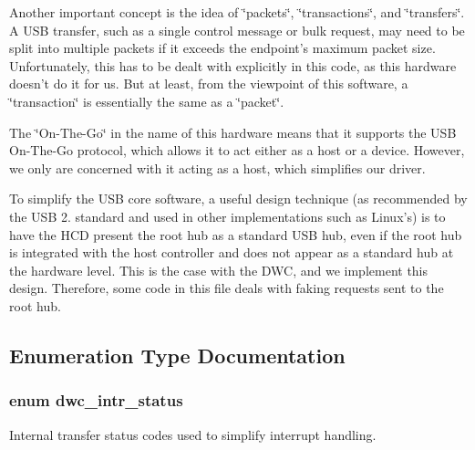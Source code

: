 Another important concept is the idea of \char`\"{}packets\char`\"{}, \char`\"{}transactions\char`\"{}, and \char`\"{}transfers\char`\"{}. A U\-S\-B transfer, such as a single control message or bulk request, may need to be split into multiple packets if it exceeds the endpoint's maximum packet size. Unfortunately, this has to be dealt with explicitly in this code, as this hardware doesn't do it for us. But at least, from the viewpoint of this software, a \char`\"{}transaction\char`\"{} is essentially the same as a \char`\"{}packet\char`\"{}.

The \char`\"{}\-On-\/\-The-\/\-Go\char`\"{} in the name of this hardware means that it supports the U\-S\-B On-\/\-The-\/\-Go protocol, which allows it to act either as a host or a device. However, we only are concerned with it acting as a host, which simplifies our driver.

To simplify the U\-S\-B core software, a useful design technique (as recommended by the U\-S\-B 2. standard and used in other implementations such as Linux's) is to have the H\-C\-D present the root hub as a standard U\-S\-B hub, even if the root hub is integrated with the host controller and does not appear as a standard hub at the hardware level. This is the case with the D\-W\-C, and we implement this design. Therefore, some code in this file deals with faking requests sent to the root hub. 

\subsection{Enumeration Type Documentation}
\hypertarget{group__usbhcd_ga7b5f13b20e154376312b7514f9dbcb81}{
\subsubsection[{dwc\-\_\-intr\-\_\-status}]{\setlength{\rightskip}{0pt plus 5cm}enum {\bf dwc\-\_\-intr\-\_\-status}}}\label{group__usbhcd_ga7b5f13b20e154376312b7514f9dbcb81}
Internal transfer status codes used to simplify interrupt handling. 

